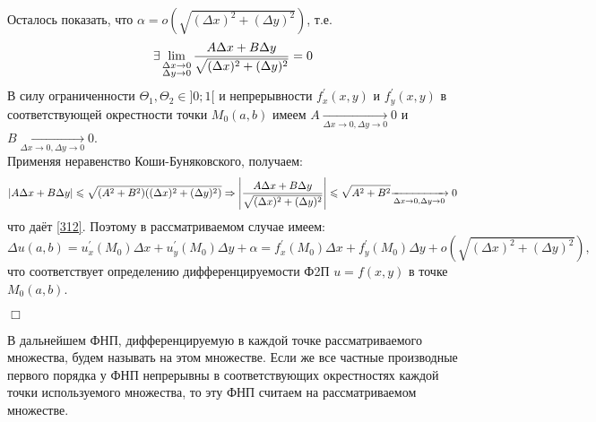 $  $

Осталось показать, что $\alpha = o\left(\sqrt{(\Delta x)^2 + (\Delta y)^2}\right)$, т.е. 
\begin{equation}
\label{312}
\exists \lim\limits_{ \substack{ \Delta x \to 0 \\ \Delta y \to 0 } } \dfrac{A \Delta x + B \Delta  y}{\sqrt{(\Delta x)^2 + (\Delta y)^2}} = 0
\end{equation}
В силу ограниченности $\Theta_1, \Theta_2 \in ]0;1[$ и непрерывности $f_x^{'}(x, y)$ и $f_y^{'}(x, y)$ в соответствующей окрестности точки $M_0(a, b)$ имеем 
$A \xrightarrow[\Delta x \to 0, \Delta y \to 0]{} 0$ и $B \xrightarrow[\Delta x \to 0, \Delta y \to 0]{} 0$.\\

Применяя неравенство Коши-Буняковского, получаем: \\
\begin{equation*}
    |A \Delta x + B \Delta y| \leqslant \sqrt{(A^2 + B^2)((\Delta x)^2 + (\Delta y)^2)} \Rightarrow \left\lvert \dfrac{A \Delta x + B \Delta y}{\sqrt{(\Delta x)^2 + (\Delta y)^2}} \right\rvert \leqslant \sqrt{A^2 + B^2}  {\xrightarrow[\Delta x \to 0, \Delta y \to 0]{} 0}
\end{equation*}
что даёт \eqref{312}. Поэтому в рассматриваемом случае имеем: 
\begin{equation*}
    \Delta u (a, b) = u_x^{'}(M_0)\Delta x + u_y^{'}(M_0)\Delta y + \alpha = f_x^{'}(M_0)\Delta x + f_y^{'}(M_0)\Delta y + o\left(\sqrt{(\Delta x)^2 + (\Delta y)^2}\right),
\end{equation*}
что соответствует определению дифференцируемости Ф2П $u = f(x,y)$ в точке $M_0 (a,b)$.

\begin{flushright} 	$\Box$	\end{flushright}

$  $\\

В дальнейшем ФНП, дифференцируемую в каждой точке рассматриваемого множества, будем называть  на этом множестве. Если же все частные производные первого порядка у ФНП непрерывны в соответствующих окрестностях каждой точки используемого множества, то эту ФНП считаем  на рассматриваемом множестве.
\newpage

